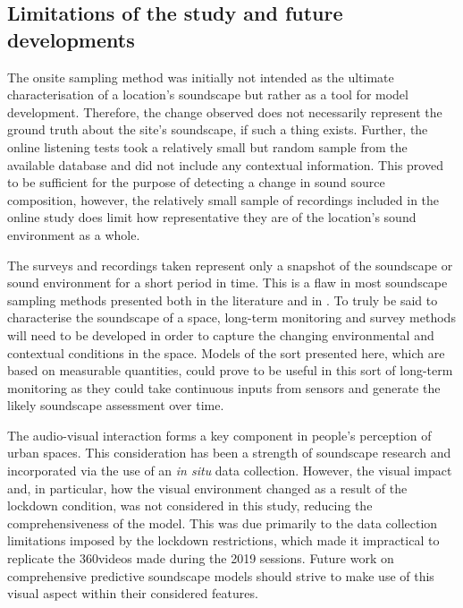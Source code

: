  \subsection{Limitations of the study and future developments}

   The onsite sampling method was initially not intended as the ultimate characterisation of a location's soundscape but rather as a tool for model development. Therefore, the change observed does not necessarily represent the ground truth about the site's soundscape, if such a thing exists. Further, the online listening tests took a relatively small but random sample from the available database and did not include any contextual information. This proved to be sufficient for the purpose of detecting a change in sound source composition, however, the relatively small sample of recordings included in the online study does limit how representative they are of the location's sound environment as a whole.

   The surveys and recordings taken represent only a snapshot of the soundscape or sound environment for a short period in time. This is a flaw in most soundscape sampling methods presented both in the literature and in \citet{ISO12913Part2}. To truly be said to characterise the soundscape of a space, long-term monitoring and survey methods will need to be developed in order to capture the changing environmental and contextual conditions in the space. Models of the sort presented here, which are based on measurable quantities, could prove to be useful in this sort of long-term monitoring as they could take continuous inputs from sensors and generate the likely soundscape assessment over time.

   The audio-visual interaction forms a key component in people's perception of urban spaces. This consideration has been a strength of soundscape research and incorporated via the use of an \emph{in situ} data collection. However, the visual impact and, in particular, how the visual environment changed as a result of the lockdown condition, was not considered in this study, reducing the comprehensiveness of the model. This was due primarily to the data collection limitations imposed by the lockdown restrictions, which made it impractical to replicate the 360\textdegree videos made during the 2019 sessions. Future work on comprehensive predictive soundscape models should strive to make use of this visual aspect within their considered features. 

